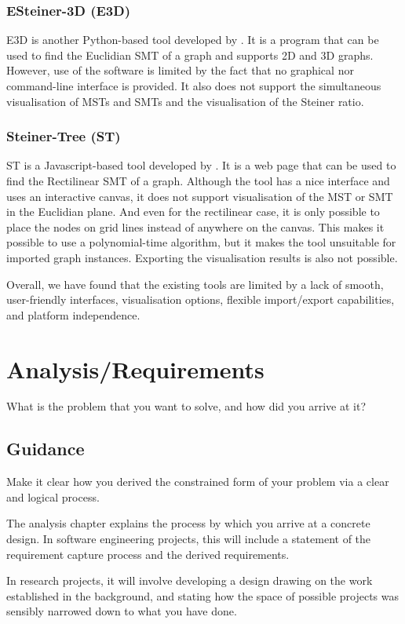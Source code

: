 \documentclass{l4proj}
\begin{document}
\subsection{ESteiner-3D (E3D)}
E3D is another Python-based tool developed by \cite{ESteiner-3D}. It is a program that can be used to find the Euclidian SMT of a graph and supports 2D and 3D graphs. However, use of the software is limited by the fact that no graphical nor command-line interface is provided. It also does not support the simultaneous visualisation of MSTs and SMTs and the visualisation of the Steiner ratio.

\subsection{Steiner-Tree (ST)}
ST is a Javascript-based tool developed by \cite{Steiner-Tree}. It is a web page that can be used to find the Rectilinear SMT of a graph. Although the tool has a nice interface and uses an interactive canvas, it does not support visualisation of the MST or SMT in the Euclidian plane. And even for the rectilinear case, it is only possible to place the nodes on grid lines instead of anywhere on the canvas. This makes it possible to use a polynomial-time algorithm, but it makes the tool unsuitable for imported graph instances. Exporting the visualisation results is also not possible.

Overall, we have found that the existing tools are limited by a lack of smooth, user-friendly interfaces, visualisation options, flexible import/export capabilities, and platform independence.

\chapter{Analysis/Requirements}
What is the problem that you want to solve, and how did you arrive at it?
\section{Guidance}
Make it clear how you derived the constrained form of your problem via a clear and logical process.

The analysis chapter explains the process by which you arrive at a concrete design. In software
engineering projects, this will include a statement of the requirement capture process and the
derived requirements.

In research projects, it will involve developing a design drawing on
the work established in the background, and stating how the space of possible projects was
sensibly narrowed down to what you have done.
\end{document}
